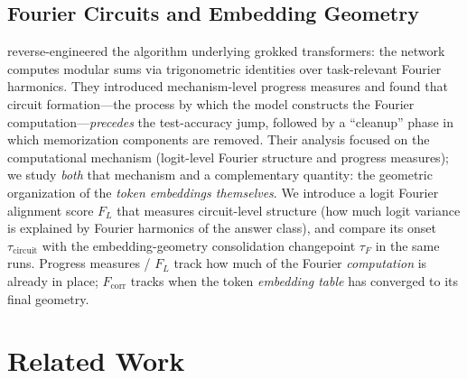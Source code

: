 \documentclass{article}
\newcommand{\tauf}{\tau_{F}}
\newcommand{\taucirc}{\tau_{\mathrm{circuit}}}
\newcommand{\fcorr}{F_{\mathrm{corr}}}
\newcommand{\flogit}{F_{L}}
\begin{document}
\subsection{Fourier Circuits and Embedding Geometry}

\citet{nanda2023progress} reverse-engineered the algorithm underlying
grokked transformers: the network computes modular sums via
trigonometric identities over task-relevant Fourier harmonics.
They introduced mechanism-level progress measures and found that
circuit formation---the process by which the model constructs the
Fourier computation---\emph{precedes} the test-accuracy jump,
followed by a ``cleanup'' phase in which memorization components are
removed.
Their analysis focused on the computational mechanism (logit-level
Fourier structure and progress measures); we study \emph{both} that
mechanism and a complementary quantity: the geometric organization of
the \emph{token embeddings themselves}.
We introduce a logit Fourier alignment score $\flogit$ that measures
circuit-level structure (how much logit variance is explained by
Fourier harmonics of the answer class), and compare its onset
$\taucirc$ with the embedding-geometry consolidation changepoint
$\tauf$ in the same runs.
Progress measures / $\flogit$ track how much of the Fourier
\emph{computation} is already in place; $\fcorr$ tracks when the
token \emph{embedding table} has converged to its final geometry.

\section{Related Work}
\label{sec:related}
\end{document}
